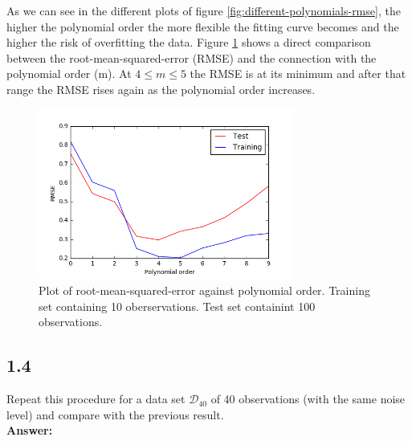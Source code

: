\documentclass[a4paper]{article}
\begin{document}
As we can see in the different plots of figure \ref{fig:different-polynomials-rmse}, the higher the polynomial order the more flexible the fitting curve becomes and the higher the risk of overfitting the data. Figure \ref{fig:rmse-polynomial-train-test} shows a direct comparison between the root-mean-squared-error (RMSE) and the connection with the polynomial order (m). At $4 \leq m \leq 5$ the RMSE is at its minimum and after that range the RMSE rises again as the polynomial order increases.


\begin{figure}[h!]
\begin{center}
\includegraphics[width=0.75\textwidth]{Images/rmse_polynomial_order.png}
\caption{Plot of root-mean-squared-error against polynomial order. Training set containing 10 oberservations. Test set containint 100 observations.}
\label{fig:rmse-polynomial-train-test}
\end{center}
\end{figure}

\newpage

\subsection*{1.4}


Repeat this procedure for a data set $\mathcal{D}_{40}$ of 40 observations (with the same noise level) and compare with the previous result.\\

\textbf{Answer:}\\
\end{document}
